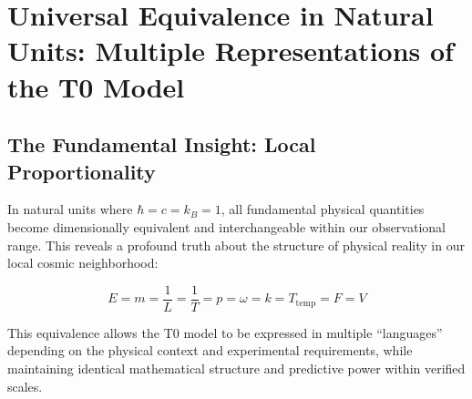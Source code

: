 \documentclass[12pt,a4paper]{article}
\begin{document}
	\appendix
	
	\section{Universal Equivalence in Natural Units: Multiple Representations of the T0 Model}
	\label{appendix:universal_equivalence}
	
	\subsection{The Fundamental Insight: Local Proportionality}
	\label{subsec:fundamental_insight_appendix}
	
	In natural units where $\hbar = c = k_B = 1$, all fundamental physical quantities become dimensionally equivalent and interchangeable within our observational range. This reveals a profound truth about the structure of physical reality in our local cosmic neighborhood:
	
	\begin{equation}
		\boxed{E = m = \frac{1}{L} = \frac{1}{T} = p = \omega = k = T_{\text{temp}} = F = V}
		\label{eq:local_equivalence}
	\end{equation}
	
	This equivalence allows the T0 model to be expressed in multiple ``languages'' depending on the physical context and experimental requirements, while maintaining identical mathematical structure and predictive power within verified scales.
	
\end{document}
